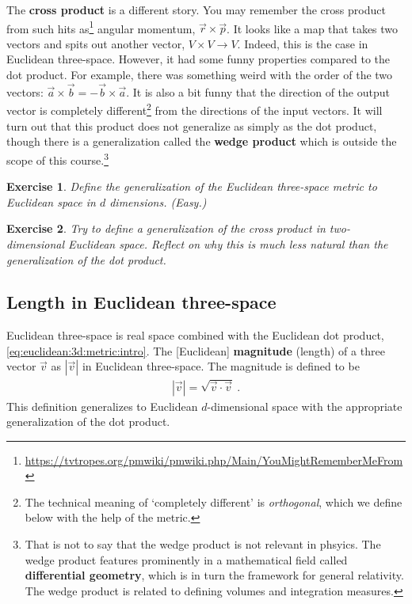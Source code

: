 \documentclass[12pt]{article}
\newtheorem{exercise}{Exercise}[section]
\begin{document}
The \textbf{cross product} is a different story. You may remember the cross product from such hits as\footnote{\url{https://tvtropes.org/pmwiki/pmwiki.php/Main/YouMightRememberMeFrom}} angular momentum, $\vec{r}\times\vec{p}$. It looks like a map that takes two vectors and spits out another vector, $V\times V \to V$. Indeed, this is the case in Euclidean three-space. However, it had some funny properties compared to the dot product. For example, there was something weird with the order of the two vectors: $\vec{a}\times \vec{b}  = - \vec{b}\times \vec{a}$. It is also a bit funny that the direction of the output vector is completely different\footnote{The technical meaning of `completely different' is \emph{orthogonal}, which we define below with the help of the metric.} from the directions of the input vectors. It will turn out that this product does not generalize as simply as the dot product, though there is a generalization called the \textbf{wedge product} which is outside the scope of this course.\footnote{That is not to say that the wedge product is not relevant in phsyics. The wedge product features prominently in a mathematical field called \textbf{differential geometry}, which is in turn the framework for general relativity. The wedge product is related to defining volumes and integration measures.}

\begin{exercise}
Define the generalization of the Euclidean three-space metric to Euclidean space in $d$ dimensions. (Easy.)
\end{exercise}

\begin{exercise}
Try to define a generalization of the cross product in two-dimensional Euclidean space. Reflect on why this is much less natural than the generalization of the dot product. 
\end{exercise}

\subsection{Length in Euclidean three-space}

Euclidean three-space is real space combined with the Euclidean dot product, \eqref{eq:euclidean:3d:metric:intro}. The [Euclidean] \textbf{magnitude} (length) of a three vector $\vec{v}$ as $|\vec{v}|$ in Euclidean three-space. The magnitude is defined to be
\begin{align}
    |\vec{v}| = \sqrt{\vec{v}\cdot\vec{v}} \ .
\end{align}
This definition generalizes to Euclidean $d$-dimensional space with the appropriate generalization of the dot product.
\end{document}
